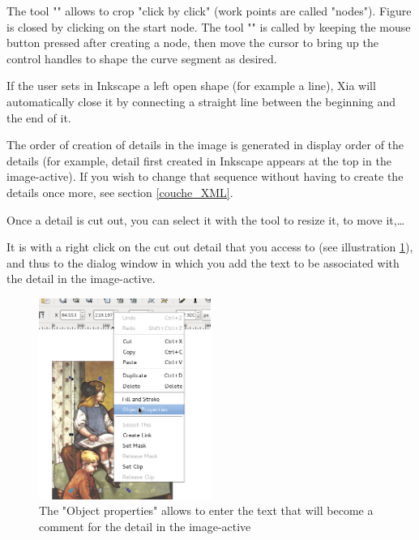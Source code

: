 The tool "" 
allows to crop "click by click" (work points are called 
"nodes").  Figure is closed by clicking on the start node. 
The tool "" is called by keeping the mouse button pressed 
after creating a node, then move the cursor to bring up the control handles 
to shape the curve segment as desired.


\begin{alerte}
  If the user sets in Inkscape a left open shape (for example a line), Xia will automatically close it  by connecting a straight line between the beginning and the end of it.
\end{alerte}


\begin{alerte}
 The order of creation of details in the image is generated in display 
order of the details (for example, detail first created in
Inkscape appears at the top in the image-active).
If you wish to change that sequence without having to create the details once more, see 
section \ref{couche_XML}.
\end{alerte}

Once a detail is cut out, you can select it with the tool  
 to resize it, to move it,\ldots

It is with a right click on the cut out detail that you access to 
 (see illustration 
\ref{objet_properties}), and 
thus to the dialog window in which you add the text to be associated with the 
detail in the image-active.

\begin{figure}[htp]
 \centering
 \includegraphics[width=0.5\textwidth]{./images/proprietes_objet}
 \caption{The "Object properties" allows to enter the text that will become a 
 comment for the detail in the image-active}
 \label{objet_properties}
\end{figure}

